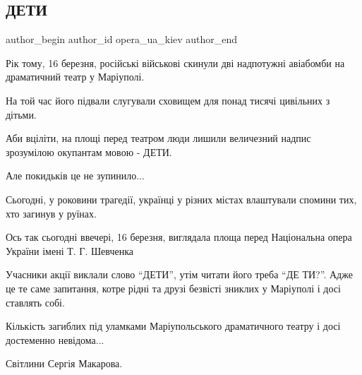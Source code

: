  
 
 
 
 

\subsection{ДЕТИ}
\label{sec:16_03_2023.fb.opera_ua_kiev.1.deti}

\ifcmt
 author_begin
   author_id opera_ua_kiev
 author_end
\fi

Рік тому, 16 березня, російські військові скинули дві надпотужні авіабомби на
драматичний театр у Маріуполі.

На той час його підвали слугували сховищем для понад тисячі цивільних з дітьми.

Аби вціліти, на площі перед театром люди лишили величезний надпис зрозумілою
окупантам мовою - ДЕТИ. 

Але покидьків це не зупинило...

Сьогодні, у роковини трагедії, українці у різних містах влаштували спомини тих,
хто загинув у руїнах.

Ось так сьогодні ввечері, 16 березня, виглядала площа перед Національна опера
України імені Т. Г. Шевченка

Учасники акції виклали слово \enquote{ДЕТИ}, утім читати його треба \enquote{ДЕ ТИ?}. Адже це
те саме запитання, котре рідні та друзі безвісті зниклих у Маріуполі і досі
ставлять собі.

Кількість загиблих під уламками Маріупольського драматичного театру і досі
достеменно невідома...

Світлини Сергія Макарова.

